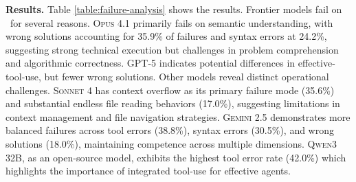 \textbf{Results.} Table \ref{table:failure-analysis} shows the results. Frontier models fail on \benchmarkname~for several reasons. \textsc{Opus 4.1} primarily fails on semantic understanding, with wrong solutions accounting for 35.9\% of failures and syntax errors at 24.2\%, suggesting strong technical execution but challenges in problem comprehension and algorithmic correctness. \textsc{GPT-5} indicates potential differences in effective-tool-use, but fewer wrong solutions. Other models reveal distinct operational challenges. \textsc{Sonnet 4} has context overflow as its primary failure mode (35.6\%) and substantial endless file reading behaviors (17.0\%), suggesting limitations in context management and file navigation strategies. \textsc{Gemini 2.5} demonstrates more balanced failures across tool errors (38.8\%), syntax errors (30.5\%), and wrong solutions (18.0\%), maintaining competence across multiple dimensions. \textsc{Qwen3 32B}, as an open-source model, exhibits the highest tool error rate (42.0\%) which highlights the importance of integrated tool-use for effective agents.
